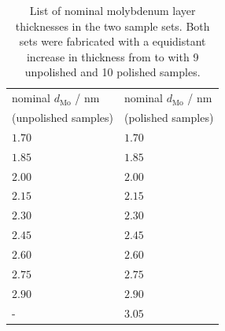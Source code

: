 \begin{table}[htbp]
\centering
\caption{List of nominal molybdenum layer thicknesses in the two sample sets. Both sets were fabricated with a equidistant increase in thickness from  to  with 9 unpolished and 10 polished samples.}
\label{ch_spec:tbl_mo_si_thickness_nominal}
\begin{tabular}{@{}ll@{}}
\toprule
nominal $d_\text{Mo}$ / nm & nominal $d_\text{Mo}$ / nm\\ 
(unpolished samples) & (polished samples) \\
\midrule
$1.70$& $1.70$\\ 
$1.85$& $1.85$\\ 
$2.00$ & $2.00$\\ 
$2.15$ & $2.15$\\ 
$2.30$& $2.30$\\ 
$2.45$& $2.45$\\ 
$2.60$& $2.60$\\ 
$2.75$ & $2.75$\\ 
$2.90$ & $2.90$\\ 
-& $3.05$\\ 
 \bottomrule
\end{tabular}
\end{table}

